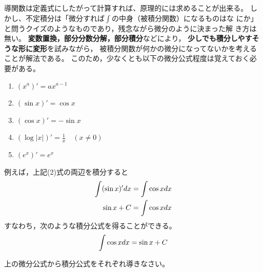 \documentclass[twocolumn,11pt]{jarticle}
\begin{document}
導関数は定義式にしたがって計算すれば、原理的には求めることが出来る。
しかし、不定積分は「微分すれば$\int$の中身（被積分関数）になるものはな
にか」と問うクイズのようなものであり，残念ながら微分のように決まった解
き方は無い。
\textbf{変数置換，部分分数分解，部分積分}などにより，
\textbf{少しでも積分しやすそうな形に変形}を試みながら，
被積分関数が何かの微分になってないかを考えることが解法である。
このため，少なくとも以下の微分公式程度は覚えておく必要がある。
\begin{enumerate}
\item $(x^a)'=ax^{a-1}$%
\item $(\sin x)'=\cos x$
\item $(\cos x)'=-\sin x$
\item $\displaystyle(\log |x|)'=\frac{1}{x}\quad (x\ne 0)$
\item $(e^x)'=e^x$
\end{enumerate}
\nquestion
例えば，上記(2)式の両辺を積分すると
\begin{align}
  \int(\sin x)'dx&=\int\cos x dx\notag\\
  \sin x + C&= \int\cos x dx\notag
\end{align}
すなわち，次のような積分公式を得ることができる。
\begin{align}
\int\cos x dx=\sin x +C\notag
\end{align}

上の微分公式から積分公式をそれぞれ導きなさい。
\end{document}
